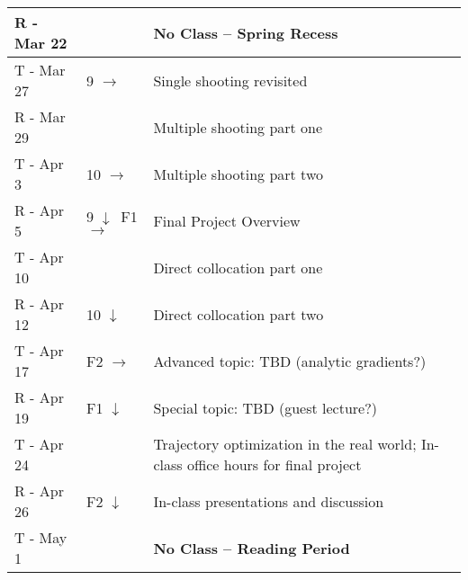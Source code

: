 \documentclass[onecolumn]{article}
\newcommand{\ra}{$\rightarrow$}
\newcommand{\da}{$\downarrow$}
\begin{document}
\begin{table}
\begin{tabular}{l|l|l}
    R - Mar 22 &       & \textbf{No Class -- Spring Recess} \\
    \hline
    T - Mar 27 &  9 \ra & Single shooting revisited \\
    R - Mar 29 &        & Multiple shooting part one \\
    T - Apr 3  & 10 \ra & Multiple shooting part two \\
    \hline
    R - Apr 5  & 9  \da \ F1 \ra & Final Project Overview \\
    T - Apr 10 &                 & Direct collocation part one \\
    \hline
    R - Apr 12 & 10 \da & Direct collocation part two \\
    T - Apr 17 & F2 \ra & Advanced topic: TBD  (analytic gradients?) \\
    \hline
    R - Apr 19 & F1 \da & Special topic:  TBD  (guest lecture?) \\
    T - Apr 24 &        & Trajectory optimization in the real world; In-class office hours for final project \\
    R - Apr 26 & F2 \da & In-class presentations and discussion \\
    T - May 1  &        & \textbf{No Class -- Reading Period} \\
    \hline
    \end{tabular}
\end{table}



\end{document}
